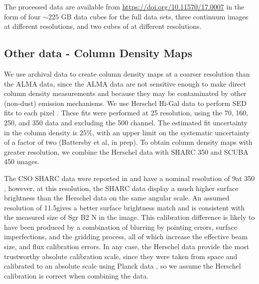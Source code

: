 \documentclass[twocolumn]{aastex61}
\begin{document}
The processed data are available from \url{https://doi.org/10.11570/17.0007} in
the form of four $\sim225$ GB data cubes for the full data sets, three
continuum images at different resolutions, and two cubes of \cyanoacetylene at
different resolutions. 

\subsection{Other data - Column Density Maps}
\label{sec:colmaps}
We use archival data to create column density maps at a coarser
resolution than the ALMA data, since the ALMA data are not sensitive
enough to make direct column density measurements and because they
may be contaminated by other (non-dust) emission mechanisms.   We use Herschel
Hi-Gal data \citep{Molinari2010a} to perform SED fits to each pixel
\citep[][and in prep]{Battersby2011a}.  These fits were performed at 25\arcsec
resolution, using the 70, 160, 250, and 350 \um data and excluding the 500 \um
channel.  The estimated fit uncertainty in the column density is $25\%$, with
an upper limit on the systematic uncertainty of a factor of two (Battersby et
al, in prep).  To obtain column density maps with greater resolution, we
combine the Herschel data with SHARC 350 \um and SCUBA 450 \um images.


The CSO SHARC data were reported in \citet{Bally2010a} and have a nominal
resolution of 9\arcsec at 350 \um, however, at this resolution, the SHARC data
display a much higher surface brightness than the Herschel data on the same
angular scale.  An assumed resolution of 11.5\arcsec gives a better surface
brightness match and is consistent with the measured size of Sgr B2 N in the
image.  This calibration difference is likely to have been produced by a
combination of blurring by pointing errors, surface imperfections, and the
gridding process, all of which increase the effective beam size, and flux
calibration errors.  In any case, the Herschel data provide the most
trustworthy absolute calibration scale, since they were taken from space and
calibrated to an absolute scale using Planck data
\citep{Bendo2013a,Bertincourt2016a}, so we assume the Herschel calibration is
correct when combining the data.
\end{document}
